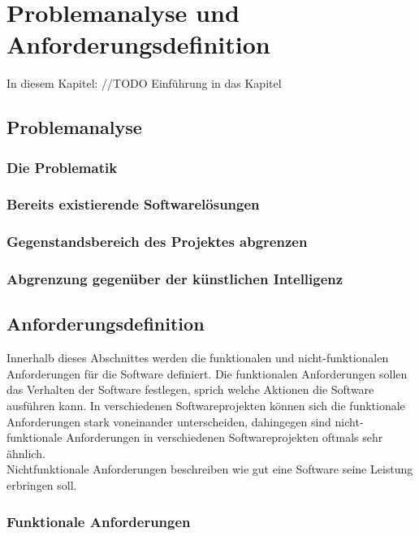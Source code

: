 \chapter{Problemanalyse und Anforderungsdefinition}
\label{cha:pua}

In diesem Kapitel: //TODO Einführung in das Kapitel

\section{Problemanalyse}

\subsection{Die Problematik}

\subsection{Bereits existierende Softwarelösungen}

\subsection{Gegenstandsbereich des Projektes abgrenzen}

\subsection{Abgrenzung gegenüber der künstlichen Intelligenz}

\section{Anforderungsdefinition}
\label{sec:anforderungsdefinition}
Innerhalb dieses Abschnittes werden die funktionalen und nicht-funktionalen Anforderungen für die Software definiert. Die funktionalen Anforderungen sollen das Verhalten der Software festlegen, sprich welche Aktionen die Software ausführen kann. In verschiedenen Softwareprojekten können sich die funktionale Anforderungen stark voneinander unterscheiden, dahingegen sind nicht-funktionale Anforderungen in verschiedenen Softwareprojekten oftmals sehr ähnlich.\\ 
Nichtfunktionale Anforderungen beschreiben wie gut eine Software seine Leistung erbringen soll.

\subsection{Funktionale Anforderungen}

